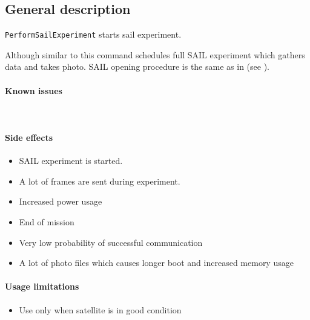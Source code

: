 

\subsection{General description}
\texttt{PerformSailExperiment} starts sail experiment. 


Although similar to  this command schedules full SAIL experiment which gathers data and takes photo. SAIL opening procedure is the same as in  (see ).

\paragraph{Known issues} \mbox{} \\ \None

\paragraph{Side effects}
\begin{itemize}
	\item SAIL experiment is started.
	\item A lot of frames are sent during experiment.
	\item Increased power usage
	\item End of mission
	\item Very low probability of successful communication
	\item A lot of photo files which causes longer boot and increased memory usage
\end{itemize}

\paragraph{Usage limitations}
\begin{itemize}
	\item Use only when satellite is in good condition
\end{itemize}

